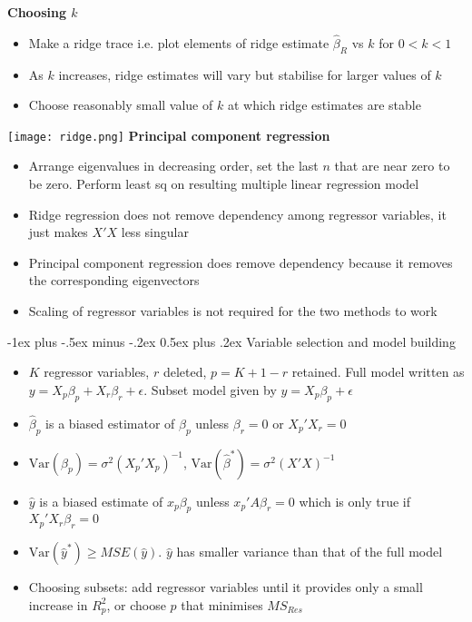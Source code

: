 \documentclass[frenchspacing,9pt,landscape,a4paper]{article}
\makeatletter
\renewcommand{\section}{\@startsection{section}{1}{0mm}%
                                {-1ex plus -.5ex minus -.2ex}%
                                {0.5ex plus .2ex}%
                                {\normalfont\large\bfseries}}
\makeatother
\begin{document}
\begin{multicols}{3}
\textbf{Choosing $k$}
\begin{itemize}
	\item Make a ridge trace i.e. plot elements of ridge estimate $\hat{\beta}_R$ vs  $k$ for  $0<k<1$
	\item As  $k$ increases, ridge estimates will vary but stabilise for larger values of  $k$
	\item Choose reasonably small value of  $k$ at which ridge estimates are stable
\end{itemize}
\texttt{[image: ridge.png]}
\textbf{Principal component regression}
\begin{itemize}
	\item Arrange eigenvalues in decreasing order, set the last $n$ that are near zero to be zero. Perform least sq on resulting multiple linear regression model
	\item Ridge regression does not remove dependency among regressor variables, it just makes $X'X$ less singular
	\item Principal component regression does remove dependency because it removes the corresponding eigenvectors
	\item Scaling of regressor variables is not required for the two methods to work
\end{itemize}
\section{Variable selection and model building}

\begin{itemize}
	\item $K$ regressor variables,  $r$ deleted,  $p=K+1-r$ retained. Full model written as  $y=X_p\beta_p+X_r\beta_r+\epsilon$. Subset model given by  $y=X_p\beta_p+\epsilon$
	\item  $\hat{\beta}_p$ is a biased estimator of  $\beta_p$ unless  $\beta_r=0$ or  $X_p'X_r=0$
	\item  $\text{Var}(\hat{\beta}_p)=\sigma^2(X_p'X_p)^{-1}$,  $\text{Var}(\hat{\beta}^*)=\sigma^2(X'X)^{-1}$ 
	\item $\hat{y}$ is a biased estimate of  $x_p\beta_p$ unless  $x_p'A\beta_r=0$ which is only true if  $X_p'X_r\beta_r=0$
	\item $\text{Var}(\hat{y}^*)\geq MSE(\hat{y})$.  $\hat{y}$ has smaller variance than that of the full model
	\item Choosing subsets: add regressor variables until it provides only a small increase in $R_p^2$, or choose  $p$ that minimises  $MS_{Res}$
\end{itemize}

\end{multicols}
\end{document}
